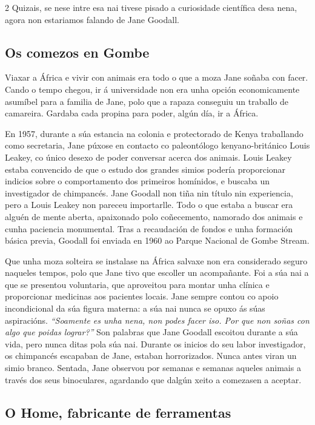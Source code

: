\begin{multicols}{2}
Quizais, se nese intre esa nai tivese pisado a curiosidade científica
desa nena, agora non estariamos falando de Jane Goodall.

\subsection*{Os comezos en Gombe}

Viaxar a África e vivir con animais era todo o que a moza Jane soñaba con
facer. Cando o tempo chegou, ir á universidade non era unha opción
economicamente asumíbel para a familia de Jane, polo que a rapaza conseguiu un
traballo de camareira. Gardaba cada propina para poder, algún día, ir a África.

En 1957, durante a súa estancia na colonia e protectorado de Kenya traballando
como secretaria, Jane púxose en contacto co paleontólogo kenyano-británico
Louis Leakey, co único desexo de poder conversar acerca dos animais. Louis
Leakey estaba convencido de que o estudo dos grandes simios podería
proporcionar indicios sobre o comportamento dos primeiros homínidos, e buscaba
un investigador de chimpancés. Jane Goodall non tiña nin título nin
experiencia, pero a Louis Leakey non pareceu importarlle. Todo o que estaba a
buscar era alguén de mente aberta, apaixonado polo coñecemento, namorado dos
animais e cunha paciencia monumental. Tras a recaudación de fondos e unha
formación básica previa, Goodall foi enviada en 1960 ao Parque Nacional de
Gombe Stream.

Que unha moza solteira se instalase na África salvaxe non era considerado
seguro naqueles tempos, polo que Jane tivo que escoller un acompañante. Foi a
súa nai a que se presentou voluntaria, que aproveitou para montar unha clínica
e proporcionar medicinas aos pacientes locais. Jane sempre contou co apoio
incondicional da súa figura materna: a súa nai nunca se opuxo ás súas
aspiracións. \textit{``Soamente es unha nena, non podes facer iso. Por que non
soñas con algo que poidas lograr?''} Son palabras que Jane Goodall escoitou
durante a súa vida, pero nunca ditas pola súa nai. Durante os inicios do seu
labor investigador, os chimpancés escapaban de Jane, estaban horrorizados.
Nunca antes viran un simio branco. Sentada, Jane observou por semanas e semanas
aqueles animais a través dos seus binoculares, agardando que dalgún xeito a
comezasen a aceptar.

\subsection*{O Home, fabricante de ferramentas}


\end{multicols}
